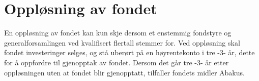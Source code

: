 \section{Oppløsning av fondet}
En oppløsning av fondet kan kun skje dersom et enstemmig fondstyre og
generalforsamlingen ved kvalifisert flertall stemmer for. Ved oppløsning skal
fondet investeringer selges, og stå uberørt på en høyrentekonto i tre -3- år,
dette for å oppfordre til gjenopptak av fondet. Dersom det går tre -3- år etter
oppløsningen uten at fondet blir gjenopptatt, tilfaller fondets midler Abakus.
